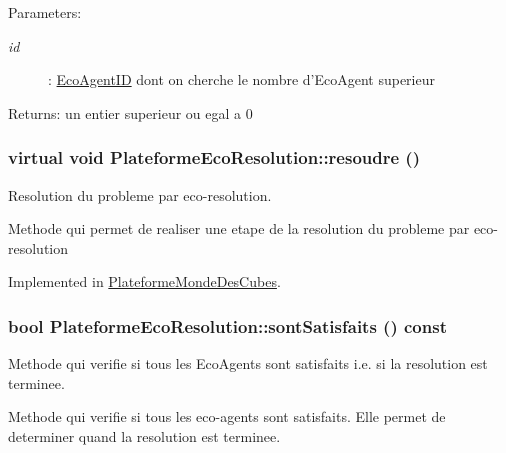 \begin{Desc}
\item[Parameters:]
\begin{description}
\item[{\em id}]: \hyperlink{classEcoAgentID}{EcoAgentID} dont on cherche le nombre d'EcoAgent superieur \end{description}
\end{Desc}
\begin{Desc}
\item[Returns:]un entier superieur ou egal a 0 \end{Desc}
\hypertarget{classPlateformeEcoResolution_17f587580cd8aee537551bc0ddd82bef}{
\subsubsection[{resoudre}]{\setlength{\rightskip}{0pt plus 5cm}virtual void PlateformeEcoResolution::resoudre ()}}
\label{classPlateformeEcoResolution_17f587580cd8aee537551bc0ddd82bef}


Resolution du probleme par eco-resolution. 

Methode qui permet de realiser une etape de la resolution du probleme par eco-resolution 

Implemented in \hyperlink{classPlateformeMondeDesCubes_c7be18c8d02e2743e884545828cfabed}{PlateformeMondeDesCubes}.\hypertarget{classPlateformeEcoResolution_673b4d17360ab1ff1e7c7f28a1b2e35e}{
\subsubsection[{sontSatisfaits}]{\setlength{\rightskip}{0pt plus 5cm}bool PlateformeEcoResolution::sontSatisfaits () const}}
\label{classPlateformeEcoResolution_673b4d17360ab1ff1e7c7f28a1b2e35e}


Methode qui verifie si tous les EcoAgents sont satisfaits i.e. si la resolution est terminee. 

Methode qui verifie si tous les eco-agents sont satisfaits. Elle permet de determiner quand la resolution est terminee.

